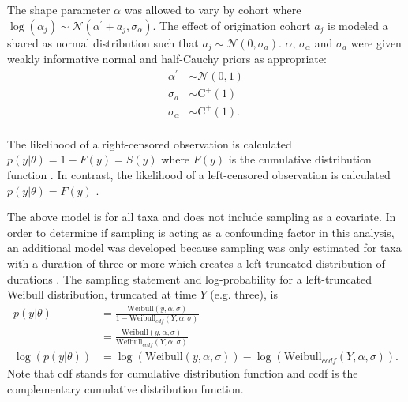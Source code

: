 \documentclass{article}
\begin{document}
The shape parameter \(\alpha\) was allowed to vary by cohort where \(\log(\alpha_{j}) \sim \mathcal{N}(\alpha^{\prime} + a_{j}, \sigma_{\alpha})\). The effect of origination cohort \(a_{j}\) is modeled a shared as normal distribution such that \(a_{j} \sim \mathcal{N}(0, \sigma_{a})\). \(\alpha\), \(\sigma_{\alpha}\) and \(\sigma_{a}\) were given weakly informative normal and half-Cauchy priors as appropriate: 
\begin{equation*}
  \begin{aligned}
    \alpha^{\prime} &\sim \mathcal{N}(0, 1) \\
    \sigma_{a} &\sim \mathrm{C^{+}}(1) \\
    \sigma_{\alpha} &\sim \mathrm{C^{+}}(1). \\
  \end{aligned}
  \label{eq:alpha_prior}
\end{equation*}

The likelihood of a right-censored observation is calculated \(p(y | \theta) = 1 - F(y) = S(y)\) where \(F(y)\) is the cumulative distribution function \citep{Klein2003}. In contrast, the likelihood of a left-censored observation is calculated \(p(y | \theta) = F(y)\) \citep{Klein2003}.

The above model is for all taxa and does not include sampling as a covariate. In order to determine if sampling is acting as a confounding factor in this analysis, an additional model was developed because sampling was only estimated for taxa with a duration of three or more which creates a left-truncated distribution of durations \citep{Klein2003}. The sampling statement and log-probability for a left-truncated Weibull distribution, truncated at time \(Y\) (e.g. three), is
\begin{equation}
  \begin{aligned}
    p(y | \theta) &= \frac{\mathrm{Weibull}(y, \alpha, \sigma)}{1 - \mathrm{Weibull}_{cdf}(Y, \alpha, \sigma)} \\
    &= \frac{\mathrm{Weibull}(y, \alpha, \sigma)}{\mathrm{Weibull}_{ccdf}(Y, \alpha, \sigma)} \\
    \log(p(y | \theta)) &= \log(\mathrm{Weibull}(y, \alpha, \sigma)) - \log(\mathrm{Weibull}_{ccdf}(Y, \alpha, \sigma)).
  \end{aligned}
  \label{eq:trunc}
\end{equation}
Note that cdf stands for cumulative distribution function and ccdf is the complementary cumulative distribution function.
\end{document}
